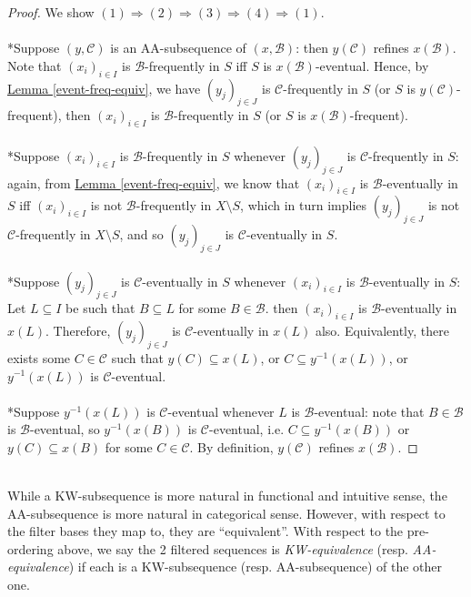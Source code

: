 \documentclass{treatise}
\begin{document}
\begin{proof}
We show $(1) \Rightarrow (2) \Rightarrow (3) \Rightarrow (4) \Rightarrow (1)$.
\\
\\
*Suppose $(y, \mathcal{C})$ is an AA-subsequence of $(x, \mathcal{B})$: then $y(\mathcal{C})$ refines $x(\mathcal{B})$. Note that $(x_i)_{i \in I}$ is $\mathcal{B}$-frequently in $S$ iff $S$ is $x(\mathcal{B})$-eventual. Hence, by \hyperref[event-freq-equiv]{Lemma \ref*{event-freq-equiv}}, we have $(y_j)_{j \in J}$ is $\mathcal{C}$-frequently in $S$ (or $S$ is $y(\mathcal{C})$-frequent), then $(x_i)_{i \in I}$ is $\mathcal{B}$-frequently in $S$ (or $S$ is $x(\mathcal{B})$-frequent).
\\
\\
*Suppose $(x_i)_{i \in I}$ is $\mathcal{B}$-frequently in $S$ whenever $(y_j)_{j \in J}$ is $\mathcal{C}$-frequently in $S$: again, from \hyperref[event-freq-equiv]{Lemma \ref*{event-freq-equiv}}, we know that $(x_i)_{i \in I}$ is $\mathcal{B}$-eventually in $S$ iff $(x_i)_{i \in I}$ is not $\mathcal{B}$-frequently in $X \setminus S$, which in turn  implies $(y_j)_{j \in J}$ is not $\mathcal{C}$-frequently in $X \setminus S$, and so $(y_j)_{j \in J}$ is $\mathcal{C}$-eventually in $S$.
\\
\\
*Suppose $(y_j)_{j \in J}$ is $\mathcal{C}$-eventually in $S$ whenever $(x_i)_{i \in I}$ is $\mathcal{B}$-eventually in $S$: Let $L \subseteq I$ be such that $B \subseteq L$ for some $B \in \mathcal{B}$. then $(x_i)_{i \in I}$ is $\mathcal{B}$-eventually in $x(L)$. Therefore, $(y_j)_{j \in J}$ is $\mathcal{C}$-eventually in $x(L)$ also. Equivalently, there exists some $C \in \mathcal{C}$ such that $y(C) \subseteq x(L)$, or $C \subseteq y^{-1}(x(L))$, or $y^{-1}(x(L))$ is $\mathcal{C}$-eventual.
\\
\\
*Suppose $y^{-1}(x(L))$ is $\mathcal{C}$-eventual whenever $L$ is $\mathcal{B}$-eventual: note that $B \in \mathcal{B}$ is $\mathcal{B}$-eventual, so $y^{-1}(x(B))$ is $\mathcal{C}$-eventual, i.e. $C \subseteq y^{-1}(x(B))$ or $y(C) \subseteq x(B)$ for some $C \in \mathcal{C}$. By definition, $y(\mathcal{C})$ refines $x(\mathcal{B})$.
\end{proof}
\ \\
While a KW-subsequence is more natural in functional and intuitive sense, the AA-subsequence is more natural in categorical sense. However, with respect to the filter bases they map to, they are ``equivalent''. With respect to the pre-ordering above, we say the 2 filtered sequences is \emph{KW-equivalence} (resp. \emph{AA-equivalence}) if each is a KW-subsequence (resp. AA-subsequence) of the other one.
\end{document}
